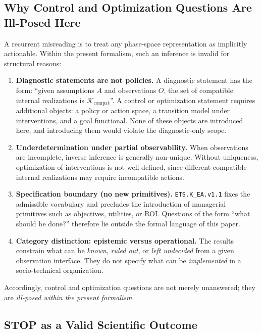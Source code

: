 \subsection{Why Control and Optimization Questions Are Ill-Posed Here}
\label{subsec:why-control-illposed}

A recurrent misreading is to treat any phase-space representation as implicitly
actionable.
Within the present formalism, such an inference is invalid for structural
reasons:

\begin{enumerate}
  \item \textbf{Diagnostic statements are not policies.}
  A diagnostic statement has the form:
  ``given assumptions $A$ and observations $O$, the set of compatible internal
  realizations is $\mathcal{K}_{\text{compat}}$''.
  A control or optimization statement requires additional objects: a policy or
  action space, a transition model under interventions, and a goal functional.
  None of these objects are introduced here, and introducing them would violate
  the diagnostic-only scope.

  \item \textbf{Underdetermination under partial observability.}
  When observations are incomplete, inverse inference is generally non-unique.
  Without uniqueness, optimization of interventions is not well-defined, since
  different compatible internal realizations may require incompatible actions.

  \item \textbf{Specification boundary (no new primitives).}
  \texttt{ETS.K\_EA.v1.1} fixes the admissible vocabulary and precludes the
  introduction of managerial primitives such as objectives, utilities, or ROI.
  Questions of the form ``what should be done?'' therefore lie outside the formal
  language of this paper.

  \item \textbf{Category distinction: epistemic versus operational.}
  The results constrain what can be \emph{known}, \emph{ruled out}, or
  \emph{left undecided} from a given observation interface.
  They do not specify what can be \emph{implemented} in a socio-technical
  organization.
\end{enumerate}

Accordingly, control and optimization questions are not merely unanswered; they
are \emph{ill-posed within the present formalism}.

\subsection{STOP as a Valid Scientific Outcome}
\label{subsec:stop-valid-outcome}

